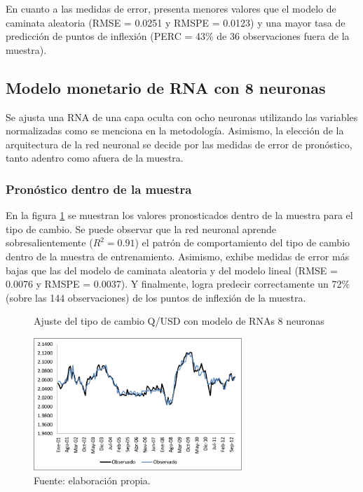 En cuanto a las medidas de error, presenta menores valores que el modelo de caminata aleatoria (RMSE = 0.0251 y RMSPE = 0.0123) y una mayor tasa de predicción de puntos de inflexión (PERC = 43\% de 36 observaciones fuera de la muestra).

\clearpage

\subsection{Modelo monetario de RNA con 8 neuronas}
Se ajusta una RNA de una capa oculta con ocho neuronas utilizando las variables normalizadas como se menciona en la metodología. 
Asimismo, la elección de la arquitectura de la red neuronal se decide por las medidas de error de pronóstico, tanto adentro como afuera de la muestra.

\subsubsection{Pronóstico dentro de la muestra}
En la figura \ref{fig:annin18} se muestran los valores pronosticados dentro de la muestra para el tipo de cambio. Se puede observar que la red neuronal aprende sobresalientemente ($R^2 = 0.91$) el patrón de comportamiento del tipo de cambio dentro de la muestra de entrenamiento. Asimismo, exhibe medidas de error más bajas que las del modelo de caminata aleatoria y del modelo lineal (RMSE = 0.0076 y RMSPE = 0.0037). Y finalmente, logra predecir correctamente un 72\% (sobre las 144 observaciones) de los puntos de inflexión de la muestra.

\begin{figure}[htb]
	\centering
	\caption{Ajuste del tipo de cambio Q/USD con modelo de RNAs 8 neuronas}
	\label{fig:annin18}
	\includegraphics[width=0.7\textwidth]{figuras/ann18_in.png}
	\caption*{Fuente: elaboración propia.}
\end{figure}

